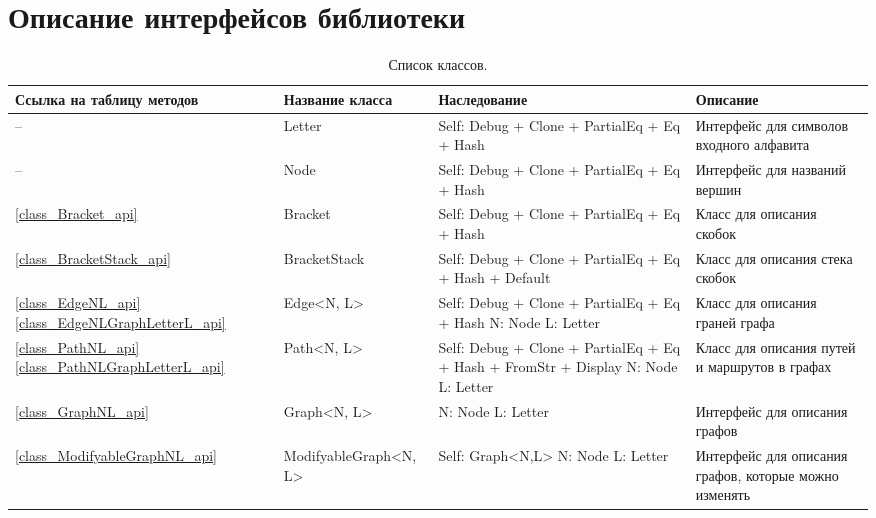 \appendix
\chapter{Описание интерфейсов библиотеки} \label{AppendixA}

\begin{longtable}[c]{|m{4em}|m{9em}|m{10em}|m{10em}|}
    \caption{Список классов.\label{all_class_table}}\\

    \hline
        \textbf{Ссылка на таблицу методов} & \textbf{Название класса} & \textbf{Наследование} & \textbf{Описание}\\
    \hline
        -- & Letter & Self: Debug + Clone + PartialEq + Eq + Hash & Интерфейс для символов входного алфавита \\
    \hline
        -- & Node & Self: Debug + Clone + PartialEq + Eq + Hash  & Интерфейс для названий вершин \\
    \hline
        \ref{class_Bracket_api} & Bracket & Self: Debug + Clone + PartialEq + Eq + Hash  & Класс для описания скобок \\
    \hline
        \ref{class_BracketStack_api} & BracketStack & Self: Debug + Clone + PartialEq + Eq + Hash + Default & Класс для описания стека скобок \\
    \hline
        \ref{class_EdgeNL_api} \newline \ref{class_EdgeNLGraphLetterL_api} & Edge<N, L> & Self: Debug + Clone + PartialEq + Eq + Hash \newline N: Node \newline  L: Letter & Класс для описания граней графа \\
    \hline
        \ref{class_PathNL_api} \newline \ref{class_PathNLGraphLetterL_api} & Path<N, L> & Self: Debug + Clone + PartialEq + Eq + Hash + FromStr + Display \newline N: Node \newline L: Letter & Класс для описания путей и маршрутов в графах \\
    \hline
        \ref{class_GraphNL_api} & Graph<N, L> & N: Node \newline L: Letter & Интерфейс для описания графов \\
    \hline
        \ref{class_ModifyableGraphNL_api} & ModifyableGraph<N, L> & Self: Graph<N,L> \newline N: Node \newline L: Letter & Интерфейс для описания графов, которые можно изменять \\

\end{longtable}
